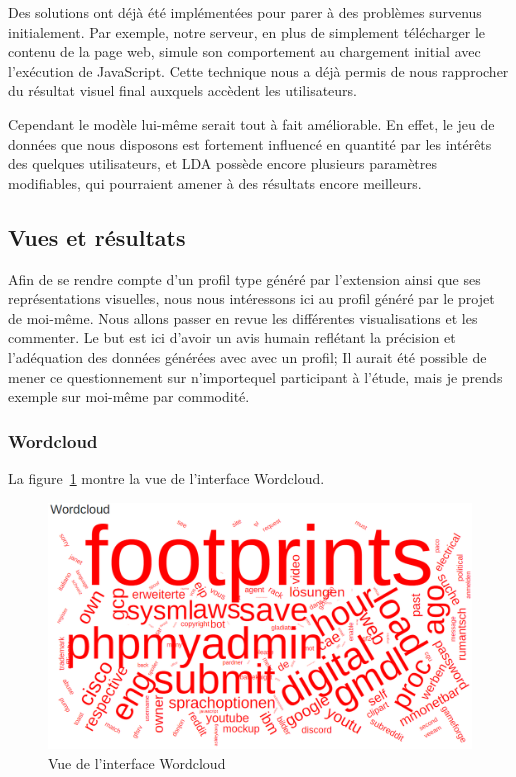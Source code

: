 				Des solutions ont déjà été implémentées pour parer à des problèmes survenus initialement. Par exemple, notre serveur, en plus de simplement télécharger le contenu de la page web, simule son comportement au chargement initial avec l'exécution de JavaScript. Cette technique nous a déjà permis de nous rapprocher du résultat visuel final auxquels accèdent les utilisateurs.

			Cependant le modèle lui-même serait tout à fait améliorable. En effet, le jeu de données que nous disposons est fortement influencé en quantité par les intérêts des quelques utilisateurs, et LDA possède encore plusieurs paramètres modifiables, qui pourraient amener à des résultats encore meilleurs.

	\subsection{Vues et résultats}\label{evaluation-vues}

		Afin de se rendre compte d'un profil type généré par l'extension ainsi que ses représentations visuelles, nous nous intéressons ici au profil généré par le projet de moi-même. Nous allons passer en revue les différentes visualisations et les commenter. Le but est ici d'avoir un avis humain reflétant la précision et l'adéquation des données générées avec avec un profil; Il aurait été possible de mener ce questionnement sur n'importequel participant à l'étude, mais je prends exemple sur moi-même par commodité.

		\subsubsection{Wordcloud}

		La figure~\ref{critique-wordcloud} montre la vue de l'interface Wordcloud.

		\begin{figure}[!h]
			\centering
			\includegraphics[width=1\textwidth]{images/results/critique-wordcloud}
			\caption{Vue de l'interface Wordcloud}
			\label{critique-wordcloud}
		\end{figure}

